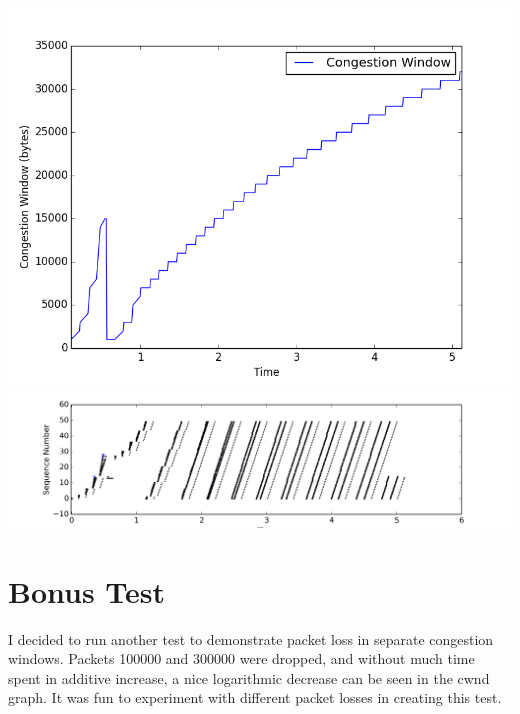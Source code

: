 \documentclass[fleqn,11pt]{article}
\begin{document}
\begin{enumerate}
\includegraphics[width=14cm]{graphs/cwnd3loss.png} \\
\includegraphics[width=16cm]{graphs/sequence3loss.png}

\end{enumerate}
\newpage
\section{Bonus Test}

I decided to run another test to demonstrate packet loss in separate congestion windows. Packets 100000 and 300000 were dropped, and without much time spent in additive increase, a nice logarithmic decrease can be seen in the cwnd graph. It was fun to experiment with different packet losses in creating this test. \\
\end{document}
